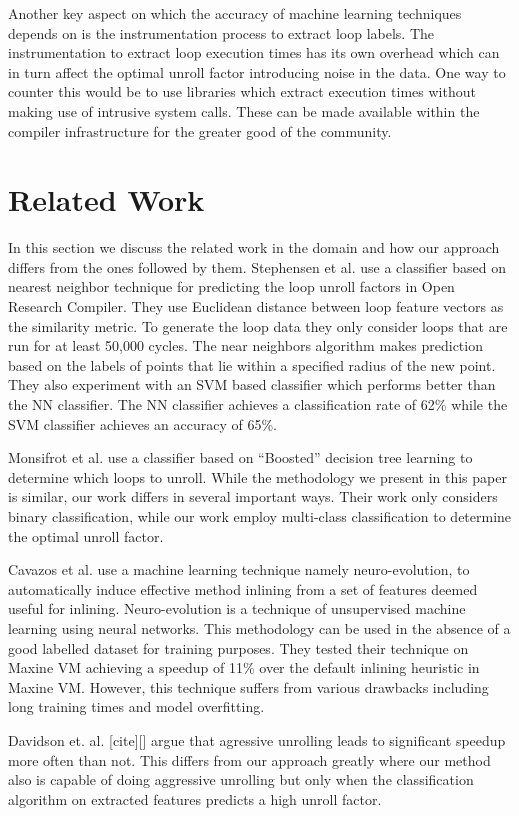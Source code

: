 \documentclass[]{sig-alternate}
\begin{document}
Another key aspect on which the accuracy of machine learning techniques depends on is the instrumentation process to extract loop labels. The instrumentation to extract loop execution times has its own overhead which can in turn affect the optimal unroll factor introducing noise in the data. One way to counter this would be to use libraries which extract execution times without making use of intrusive system calls. These can be made available within the compiler infrastructure for the greater good of the community.

\section{Related Work}
\label{sec:RelatedWork}
In this section we discuss the related work in the domain and how our approach differs from the ones followed by them.
Stephensen et al. use a classifier based on nearest neighbor technique for predicting the loop unroll factors in Open Research Compiler. They use Euclidean distance between loop feature vectors as the similarity metric. To generate the loop data they only consider loops that are run for at least 50,000 cycles. The near neighbors algorithm makes prediction based on the labels of points that lie within a specified radius of the new point. They also experiment with an SVM based classifier which performs better than the NN classifier. The NN classifier achieves a classification rate of 62\% while the SVM classifier achieves an accuracy of 65\%. 

Monsifrot et al. use a classifier based on ``Boosted'' decision tree learning to determine which loops to unroll. While the methodology we present in this paper is similar, our work differs in several important ways. Their work only considers binary classification, while our work employ multi-class classification to determine the optimal unroll factor. 

Cavazos et  al. use a machine learning technique namely neuro-evolution, to automatically induce effective method inlining from a set of features deemed useful for inlining. Neuro-evolution is a technique of unsupervised machine learning using neural networks. This methodology can be used in the absence of a good labelled dataset for training purposes. They tested their technique on Maxine VM achieving a speedup of 11\% over the default inlining heuristic in Maxine VM. However, this technique suffers from various drawbacks including long training times and model overfitting.

Davidson et. al. [cite][] argue that agressive unrolling leads to significant speedup more often than not. This differs from our approach greatly where our method also is capable of doing aggressive unrolling but only when the classification algorithm on extracted features predicts a high unroll factor.
\end{document}
